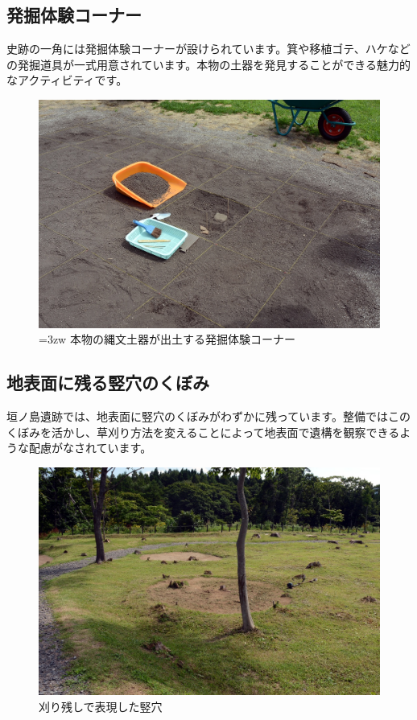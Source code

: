 \documentclass[a4j,11pt,twocolumn,openany]{jsbook}
\begin{document}
\subsection{発掘体験コーナー}

史跡の一角には発掘体験コーナーが設けられています。箕や移植ゴテ、ハケなどの発掘道具が一式用意されています。本物の土器を発見することができる魅力的なアクティビティです。

\begin{figure}[ht]
	\centering
	\includegraphics[width=\linewidth]{fig/01_Iseki_kengaku/14Hakkutu_taiken.JPG}
	\caption{\hangindent=3zw
		本物の縄文土器が出土する発掘体験コーナー}
	\label{}
\end{figure}

\subsection{地表面に残る竪穴のくぼみ}

垣ノ島遺跡では、地表面に竪穴のくぼみがわずかに残っています。整備ではこのくぼみを活かし、草刈り方法を変えることによって地表面で遺構を観察できるような配慮がなされています。

\begin{figure}[ht]
	\centering
	\includegraphics[width=\linewidth]{fig/01_Iseki_kengaku/15Kakinosima_tateana.JPG}
	\caption{刈り残しで表現した竪穴}
	\label{}
\end{figure}
\end{document}
